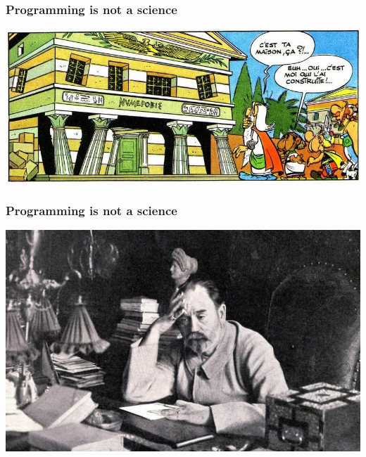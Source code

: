 \documentclass[10pt]{beamer}
\begin{document}

\begin{frame}
  \frametitle{Programming is \textbf{not} a science}

  \centering
  \includegraphics[width=\textwidth]{maison.jpg}
\end{frame}


\begin{frame}
  \frametitle{Programming is \textbf{not} a science}

  \centering
  \includegraphics[width=\textwidth]{zola.jpg}
\end{frame}

\end{document}
